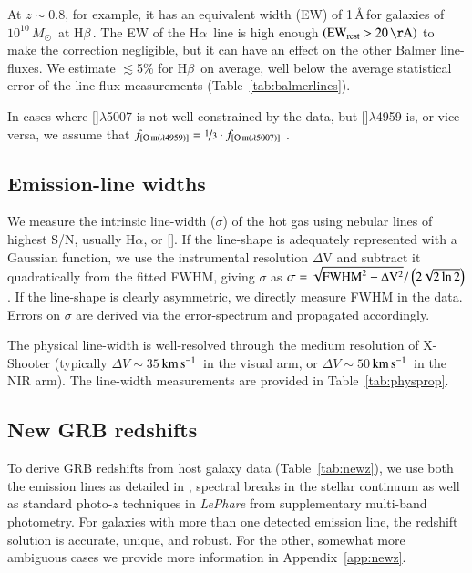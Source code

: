 \documentclass[traditabstract, longauth]{aa}
\newcommand{\kms}{$\rm{km\,s^{-1}}$}
\newcommand{\hb}{H$\beta$}
\newcommand{\ha}{H$\alpha$}
\newcommand{\oiii}{[\ion{O}{iii}]}
\newcommand{\Msun}{$M_\odot$}
\begin{document}
At $z\sim0.8$, for example, it has an equivalent width (EW) of 1\,\AA\,for galaxies of $10^{10}$\,\Msun\, at \hb\,\citep{2011ApJ...730..137Z}. The EW of the \ha\, line is high enough $(\rm{EW}_{\rm{rest}} > 20\,\AA)$ to make the correction negligible, but it can have an effect on the other Balmer line-fluxes. We estimate $\lesssim$5\% for \hb\, on average, well below the average statistical error of the line flux measurements (Table~\ref{tab:balmerlines}).
 
In cases where \oiii$\lambda$5007 is not well constrained by the data, but \oiii$\lambda$4959 is, or vice versa, we assume that $f_{[\ion{O}{iii}(\lambda 4959)]} = \nicefrac{1}{3} \cdot f_{[\ion{O}{iii}(\lambda 5007)]}$ \citep{2000MNRAS.312..813S}.

\subsection{Emission-line widths}

We measure the intrinsic line-width ($\sigma$) of the hot gas using nebular lines of highest S/N, usually \ha, or \oiii. If the line-shape is adequately represented with a Gaussian function, we use the instrumental resolution $\Delta$V and subtract it quadratically from the fitted FWHM, giving $\sigma$ as $\sigma = \sqrt{\rm{FWHM}^2 - \Delta V^2} / \left(2\sqrt{2\ln 2}\right)$. If the line-shape is clearly asymmetric, we directly measure FWHM in the data. Errors on $\sigma$ are derived via the error-spectrum and propagated accordingly.

The physical line-width is well-resolved through the medium resolution of X-Shooter (typically $\Delta V \sim 35\,$\kms\, in the visual arm, or $\Delta V \sim 50\,$\kms\, in the NIR arm). The line-width measurements are provided in Table~\ref{tab:physprop}.



\subsection{New GRB redshifts}
\label{sec:newzs}

To derive GRB redshifts from host galaxy data (Table~\ref{tab:newz}), we use both the emission lines as detailed in \citet{2012ApJ...758...46K}, spectral breaks in the stellar continuum \citep{2012ApJ...752...62J} as well as standard photo-$z$ techniques in \textit{LePhare} \citep{1999MNRAS.310..540A, 2006A&A...457..841I} from supplementary multi-band photometry. For galaxies with more than one detected emission line, the redshift solution is accurate, unique, and robust. For the other, somewhat more ambiguous cases we provide more information in Appendix~\ref{app:newz}. 
\end{document}

